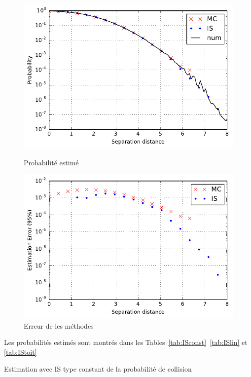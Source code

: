 \documentclass[a4paper, 12pt,twoside]{article}
\numberwithin{equation}{subsection}
\newlength{\mylength}
\begin{document}
	\begin{figure}[htbp]
		\centering
		\begin{minipage}[b]{\mylength}
			\includegraphics[width=\textwidth]{Images/Script_8_ISmc_1}
			\caption{Probabilité estimé}
			\label{fig:ISmc}
		\end{minipage}
		\hfill
		\begin{minipage}[b]{\mylength}
			\includegraphics[width=\textwidth]{Images/Script_8_ISmc_2}
			\caption{Erreur de les méthodes}
			\label{fig:ISmcErr}
		\end{minipage}
	\end{figure}
	
	Les probabilités estimés sont montrés dans les Tables~\ref{tab:ISconst}~\ref{tab:ISlin} et \ref{tab:IStoit}
	
	\begin{table}[htbp]
		\begin{center}
		\end{center}
		\caption{Estimation avec IS type constant de la probabilité de collision}
		\label{tab:ISconst}
	\end{table}
	
\end{document}
